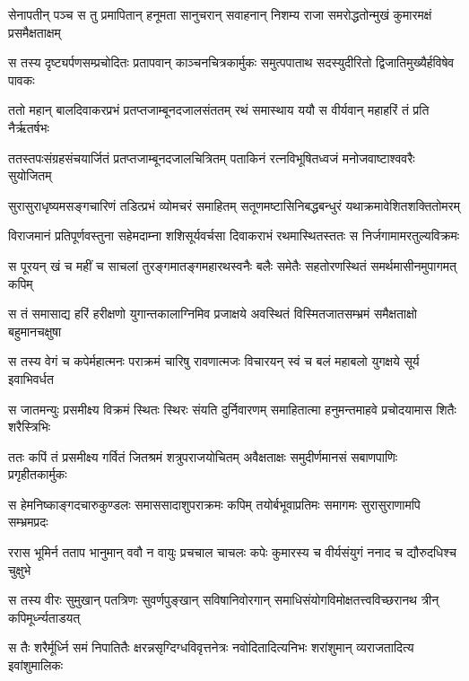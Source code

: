 
\twolineshloka
{सेनापतीन् पञ्च स तु प्रमापितान् हनूमता सानुचरान् सवाहनान्}
{निशम्य राजा समरोद्धतोन्मुखं कुमारमक्षं प्रसमैक्षताक्षम्} %

\twolineshloka
{स तस्य दृष्ट्यर्पणसम्प्रचोदितः प्रतापवान् काञ्चनचित्रकार्मुकः}
{समुत्पपाताथ सदस्युदीरितो द्विजातिमुख्यैर्हविषेव पावकः} %

\twolineshloka
{ततो महान् बालदिवाकरप्रभं प्रतप्तजाम्बूनदजालसंततम्}
{रथं समास्थाय ययौ स वीर्यवान् महाहरिं तं प्रति नैर्ऋतर्षभः} %

\twolineshloka
{ततस्तपःसंग्रहसंचयार्जितं प्रतप्तजाम्बूनदजालचित्रितम्}
{पताकिनं रत्नविभूषितध्वजं मनोजवाष्टाश्ववरैः सुयोजितम्} %

\twolineshloka
{सुरासुराधृष्यमसङ्गचारिणं तडित्प्रभं व्योमचरं समाहितम्}
{सतूणमष्टासिनिबद्धबन्धुरं यथाक्रमावेशितशक्तितोमरम्} %

\twolineshloka
{विराजमानं प्रतिपूर्णवस्तुना सहेमदाम्ना शशिसूर्यवर्चसा}
{दिवाकराभं रथमास्थितस्ततः स निर्जगामामरतुल्यविक्रमः} %

\twolineshloka
{स पूरयन् खं च महीं च साचलां तुरङ्गमातङ्गमहारथस्वनैः}
{बलैः समेतैः सहतोरणस्थितं समर्थमासीनमुपागमत् कपिम्} %

\twolineshloka
{स तं समासाद्य हरिं हरीक्षणो युगान्तकालाग्निमिव प्रजाक्षये}
{अवस्थितं विस्मितजातसम्भ्रमं समैक्षताक्षो बहुमानचक्षुषा} %

\twolineshloka
{स तस्य वेगं च कपेर्महात्मनः पराक्रमं चारिषु रावणात्मजः}
{विचारयन् स्वं च बलं महाबलो युगक्षये सूर्य इवाभिवर्धत} %

\twolineshloka
{स जातमन्युः प्रसमीक्ष्य विक्रमं स्थितः स्थिरः संयति दुर्निवारणम्}
{समाहितात्मा हनुमन्तमाहवे प्रचोदयामास शितैः शरैस्त्रिभिः} %

\twolineshloka
{ततः कपिं तं प्रसमीक्ष्य गर्वितं जितश्रमं शत्रुपराजयोचितम्}
{अवैक्षताक्षः समुदीर्णमानसं सबाणपाणिः प्रगृहीतकार्मुकः} %

\twolineshloka
{स हेमनिष्काङ्गदचारुकुण्डलः समाससादाशुपराक्रमः कपिम्}
{तयोर्बभूवाप्रतिमः समागमः सुरासुराणामपि सम्भ्रमप्रदः} %

\twolineshloka
{ररास भूमिर्न तताप भानुमान् ववौ न वायुः प्रचचाल चाचलः}
{कपेः कुमारस्य च वीर्यसंयुगं ननाद च द्यौरुदधिश्च चुक्षुभे} %

\twolineshloka
{स तस्य वीरः सुमुखान् पतत्रिणः सुवर्णपुङ्खान् सविषानिवोरगान्}
{समाधिसंयोगविमोक्षतत्त्वविच्छरानथ त्रीन् कपिमूर्ध्न्यताडयत्} %

\twolineshloka
{स तैः शरैर्मूर्ध्नि समं निपातितैः क्षरन्नसृग्दिग्धविवृत्तनेत्रः}
{नवोदितादित्यनिभः शरांशुमान् व्यराजतादित्य इवांशुमालिकः} %

